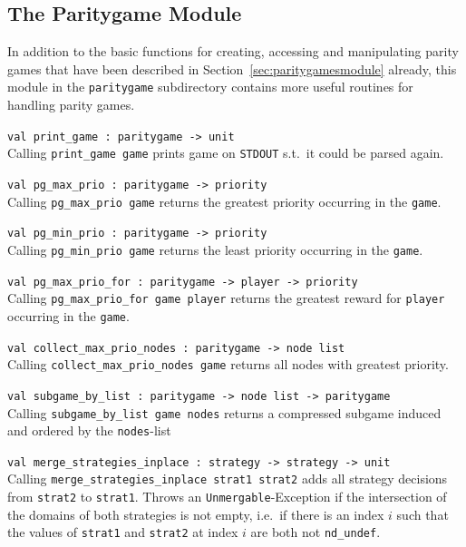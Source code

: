 \subsection{The {\ttfamily Paritygame} Module}

In addition to the basic functions for creating, accessing and manipulating parity games that have been described in
Section~\ref{sec:paritygamesmodule} already, this module in the \texttt{paritygame} subdirectory contains more useful 
routines for handling parity games. 

\begin{description}
\itemsep3mm
\item \verb+val print_game : paritygame -> unit+ \ \\
Calling \verb+print_game game+ prints game on \texttt{STDOUT} s.t.\ it could be parsed again.

\item \verb+val pg_max_prio : paritygame -> priority+ \ \\
Calling \verb+pg_max_prio game+ returns the greatest priority occurring in the \verb+game+.

\item \verb+val pg_min_prio : paritygame -> priority+ \ \\
Calling \verb+pg_min_prio game+ returns the least priority occurring in the \verb+game+.

\item \verb+val pg_max_prio_for : paritygame -> player -> priority+ \ \\
Calling \verb+pg_max_prio_for game player+ returns the greatest reward for \verb+player+ occurring in the \verb+game+.

\item \verb+val collect_max_prio_nodes : paritygame -> node list+ \ \\
Calling \verb+collect_max_prio_nodes game+ returns all nodes with greatest priority.

\item \verb+val subgame_by_list : paritygame -> node list -> paritygame+ \ \\
Calling \verb+subgame_by_list game nodes+ returns a compressed subgame induced and ordered by the \verb+nodes+-list

\item \verb+val merge_strategies_inplace : strategy -> strategy -> unit+ \ \\
Calling \verb+merge_strategies_inplace strat1 strat2+ adds all strategy decisions from \verb+strat2+ to
\verb+strat1+. Throws an \verb+Unmergable+-Exception if the intersection of the domains of both strategies is not empty, i.e.\ if
there is an index $i$ such that the values of \verb+strat1+ and \verb+strat2+ at index $i$ are both not
\verb#nd_undef#.


\end{description}
